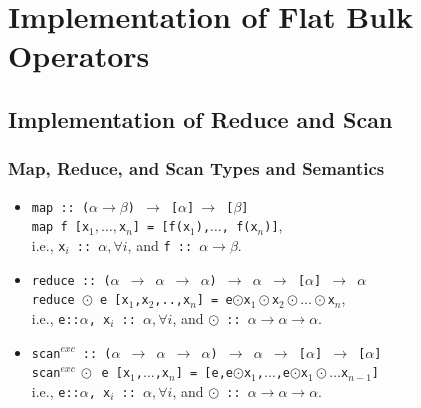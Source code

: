 \documentclass{beamer}
\renewcommand{\emph}[1]{\textcolor{structure}{#1}}
\newcommand{\emp}[1]{\textcolor{DikuRed}{ #1}}
\begin{document}
\section{Implementation of Flat Bulk Operators}

\begin{frame}[fragile]
	\tableofcontents[currentsection]
\end{frame}

\subsection{Implementation of Reduce and Scan}

\begin{frame}[fragile,t]
  \frametitle{Map, Reduce, and Scan Types and Semantics}

\begin{itemize}
    \item \emp{\tt map~::~($\alpha\rightarrow\beta$)~$\rightarrow$~[$\alpha$]$~\rightarrow$~[$\beta$]}\\
    \emph{\tt map f [x$_1,\ldots, $x$_n$] = [f(x$_1$),$\ldots$, f(x$_n$)]},\\  
        i.e., \emp{\tt{}x$_i$~::~$\alpha, \forall i$}, and 
        \emp{\tt f~::~$\alpha\rightarrow\beta$}.\medskip

    \item \emp{{\tt reduce~::~($\alpha$~$\rightarrow$~$\alpha$~$\rightarrow$~$\alpha$)~$\rightarrow$~$\alpha$~$\rightarrow$~[$\alpha$]~$\rightarrow$~$\alpha$}}\\
        \emph{\tt reduce $\odot$~e~[x$_1$,x$_2$,..,x$_n$]~=~e$\odot$x$_1\odot$x$_2\odot\ldots\odot$x$_n$},\\
        i.e., \emp{{\tt{}e::$\alpha$, x$_i$~::~$\alpha, \forall i$}}, and 
        \emp{\tt $\odot$~::~$\alpha\rightarrow\alpha\rightarrow\alpha$}.\medskip

    \item \emp{{\tt scan$^{exc}$~::~($\alpha$~$\rightarrow$~$\alpha$~$\rightarrow$~$\alpha$)~$\rightarrow$~$\alpha$~$\rightarrow$~[$\alpha$]~$\rightarrow$~[$\alpha$]}}\\
        \emph{\tt scan$^{exc}~\odot$~e~[x$_1$,$\ldots$,x$_n$]~=~[e,e$\odot$x$_1$,$\ldots$,e$\odot$x$_1\odot\ldots$x$_{n-1}$]}\\
        i.e., \emp{{\tt{}e::$\alpha$, x$_i$~::~$\alpha, \forall i$}}, and 
        \emp{\tt $\odot$~::~$\alpha\rightarrow\alpha\rightarrow\alpha$}.\medskip


\end{itemize}
\end{frame}
\end{document}
